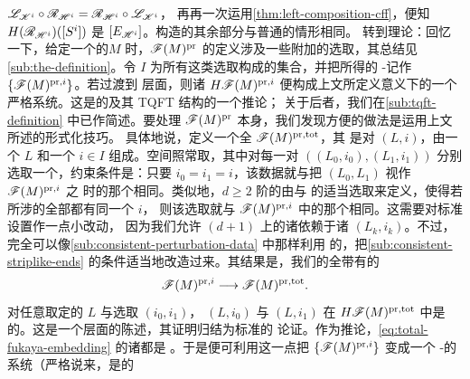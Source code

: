 $\mathscr{L}_{\mathscr{K}^i}\circ\mathscr{R}_{\mathscr{H}^i}=\mathscr{R}_{\mathscr{H}^i}\circ\mathscr{L}_{\mathscr{K}^i}$，%
再再一次运用\cref{thm:left-composition-cff}，便知 $H(\mathscr{R}_{\mathscr{H}^i})([S^i])$
是 $[E_{\mathscr{H}^i}]$。构造的其余部分与普通\trCategory{}的情形相同。
转到\trFloer{}理论：回忆一下，给定一个\trCorneredBoundary{}的\trExactSymplectic\trManifold{}$M$
时，$\mathscr{F}(M)^{\mathrm{pr}}$ 的定义涉及一些附加的选取，其总结见
\cref{sub:the-definition}。令 $I$ 为所有这类选取构成的集合，并把所得的%
\trAinfty-\trCategory\trFamily{}记作 $\{\mathscr{F}(M)^{\mathrm{pr},i}\}$。若过渡到%
\trCohomology{}层面，则诸 $H\mathscr{F}(M)^{\mathrm{pr},i}$ 便构成上文所定义意义下的一个%
严格系统。这是\trFloerCohomology{}的\trWellDefinedness{}及其 TQFT 结构的一个推论；%
关于后者，我们在\cref{sub:tqft-definition} 中已作简述。要处理
$\mathscr{F}(M)^{\mathrm{pr}}$ 本身，我们发现方便的做法是运用上文所述的形式化技巧。%
具体地说，定义一个全\trFukayaCategory{} $\mathscr{F}(M)^{\mathrm{pr,tot}}$，其\trObject{}%
是对 $(L,i)$，由一个\trExact\trLagrange\trSubmanifold{} $L$ 和一个\trIndex{} $i\in I$
组成。\trMorphism{}空间照常取\trFloer\trComplex，其中对每一对
$((L_0,i_0),(L_1,i_1))$ 分别选取一个\trRegular\trFloerDatum，约束条件是：只要
$i_0=i_1=i$，该数据就与把 $(L_0,L_1)$ 视作 $\mathscr{F}(M)^{\mathrm{pr},i}$ 之\trObject{}%
时的那个相同。类似地，$d\ge 2$ 阶的\trComposition{}由\trStriplikeEnd{}与%
\trPerturbationDatum{}的适当选取来定义，使得若所涉的全部\trObject{}都有同一个\trIndex{} $i$，%
则该选取就与 $\mathscr{F}(M)^{\mathrm{pr},i}$ 中的那个相同。这需要对标准设置作一点小改动，%
因为我们允许 $(d{+}1)$ \trPunctured\trDisk{}上的诸\trStriplikeEnd{}依赖于诸\trLabel{}
$(L_k,i_k)$。不过，完全可以像\cref{sub:consistent-perturbation-data} 中那样利用%
\trLabel\trCompatible\trFamily{}的\trGluing，把\cref{sub:consistent-striplike-ends}
的\trConsistency{}条件适当地改造过来。其结果是，我们的全\trCategory{}带有\trCanonical{}的%
\trFullyFaithful\trEmbedding
\begin{equation}\label{eq:total-fukaya-embedding}
\mathscr{F}(M)^{\mathrm{pr},i}\longrightarrow\mathscr{F}(M)^{\mathrm{pr,tot}}.
\end{equation}
对任意取定的\trExact\trLagrange\trSubmanifold{} $L$ 与\trIndex{}选取 $(i_0,i_1)$，%
\trObject{} $(L,i_0)$ 与 $(L,i_1)$ 在 $H\mathscr{F}(M)^{\mathrm{pr,tot}}$ 中是%
\trIsomorphic{}的。这是一个\trCohomology{}层面的陈述，其证明归结为标准的%
\trContinuationMap{}论证。作为推论，\eqref{eq:total-fukaya-embedding} 的诸\trEmbedding{}都是%
\trQuasiequivalence。于是便可利用这一点把 $\{\mathscr{F}(M)^{\mathrm{pr},i}\}$ 变成一个%
\trAinfty-\trCategory{}的\trCoherent{}系统（严格说来，是\trUngraded{}的%
